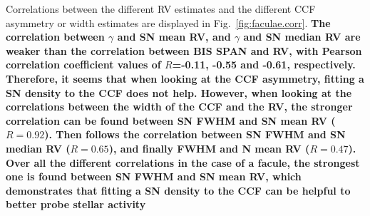\documentclass{aa}
\begin{document}
Correlations between the different RV estimates and the different CCF asymmetry or width estimates are displayed in Fig.~\ref{fig:faculae.corr}. 
{\bf The correlation between $\gamma$ and SN mean RV, and $\gamma$ and SN median RV are weaker than the correlation between BIS SPAN and RV, with Pearson correlation coefficient values of $R$=-0.11, -0.55 and -0.61, respectively. Therefore, it seems that when looking at the CCF asymmetry, fitting a SN density to the CCF does not help. However, when looking at the correlations between the width of the CCF and the RV, the stronger correlation can be found between SN FWHM and SN mean RV ($R=0.92$). Then follows the correlation between SN FWHM and SN median RV ($R=0.65$), and finally FWHM and N mean RV ($R=0.47$). Over all the different correlations in the case of a facule, the strongest one is found between SN FWHM and SN mean RV, which demonstrates that fitting a SN density to the CCF can be helpful to better probe stellar activity}
\end{document}
